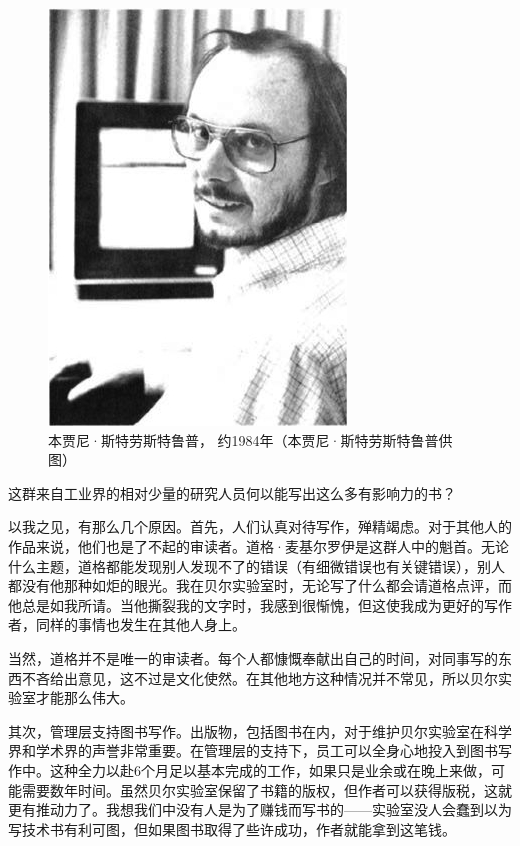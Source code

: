 \documentclass[a4paper,12pt,UTF8,twoside]{ctexbook}
\begin{document}
\begin{figure}[htbp]
	\centering
	\includegraphics[width=0.7\linewidth]{52}
	\caption{本贾尼·斯特劳斯特鲁普， 约1984年（本贾尼·斯特劳斯特鲁普供图）}
	\label{fig:1}
\end{figure}

这群来自工业界的相对少量的研究人员何以能写出这么多有影响力的书？

以我之见，有那么几个原因。首先，人们认真对待写作，殚精竭虑。对于其他人的作品来说，他们也是了不起的审读者。道格·麦基尔罗伊是这群人中的魁首。无论什么主题，道格都能发现别人发现不了的错误（有细微错误也有关键错误），别人都没有他那种如炬的眼光。我在贝尔实验室时，无论写了什么都会请道格点评，而他总是如我所请。当他撕裂我的文字时，我感到很惭愧，但这使我成为更好的写作者，同样的事情也发生在其他人身上。

当然，道格并不是唯一的审读者。每个人都慷慨奉献出自己的时间，对同事写的东西不吝给出意见，这不过是文化使然。在其他地方这种情况并不常见，所以贝尔实验室才能那么伟大。

其次，管理层支持图书写作。出版物，包括图书在内，对于维护贝尔实验室在科学界和学术界的声誉非常重要。在管理层的支持下，员工可以全身心地投入到图书写作中。这种全力以赴6个月足以基本完成的工作，如果只是业余或在晚上来做，可能需要数年时间。虽然贝尔实验室保留了书籍的版权，但作者可以获得版税，这就更有推动力了。我想我们中没有人是为了赚钱而写书的——实验室没人会蠢到以为写技术书有利可图，但如果图书取得了些许成功，作者就能拿到这笔钱。
\end{document}
